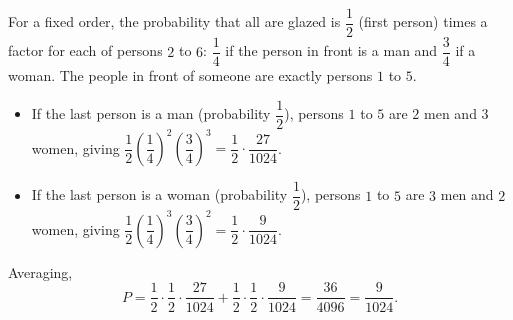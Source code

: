 For a fixed order, the probability that all are glazed is $\dfrac{1}{2}$ (first person) times a factor for each of persons $2$ to $6$: $\dfrac{1}{4}$ if the person in front is a man and $\dfrac{3}{4}$ if a woman. The people in front of someone are exactly persons $1$ to $5$.
\begin{itemize}
\item If the last person is a man (probability $\dfrac{1}{2}$), persons $1$ to $5$ are $2$ men and $3$ women, giving $\dfrac{1}{2}\left(\dfrac{1}{4}\right)^2\left(\dfrac{3}{4}\right)^3=\dfrac{1}{2}\cdot\dfrac{27}{1024}$.
\item If the last person is a woman (probability $\dfrac{1}{2}$), persons $1$ to $5$ are $3$ men and $2$ women, giving $\dfrac{1}{2}\left(\dfrac{1}{4}\right)^3\left(\dfrac{3}{4}\right)^2=\dfrac{1}{2}\cdot\dfrac{9}{1024}$.
\end{itemize}
Averaging,
\[
P=\dfrac{1}{2}\cdot\dfrac{1}{2}\cdot\dfrac{27}{1024}+\dfrac{1}{2}\cdot\dfrac{1}{2}\cdot\dfrac{9}{1024}=\dfrac{36}{4096}=\boxed{\dfrac{9}{1024}}.
\]
